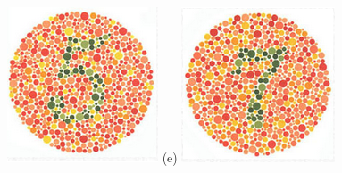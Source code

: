 \documentclass[	12pt, Times, openright, twoside, a4paper, english, brazil]{abntex2}
\begin{document}
\begin{apendicesenv}
\begin{figure}[!htb]
\centering
{\includegraphics[width=\linewidth]{ishihara-fuga/figureIshihara14.png}}
(e)
\endminipage\hfill
{}
\centering
{\includegraphics[width=\linewidth]{ishihara-fuga/figureIshihara15.png}}

\end{figure}
\end{apendicesenv}
\end{document}
